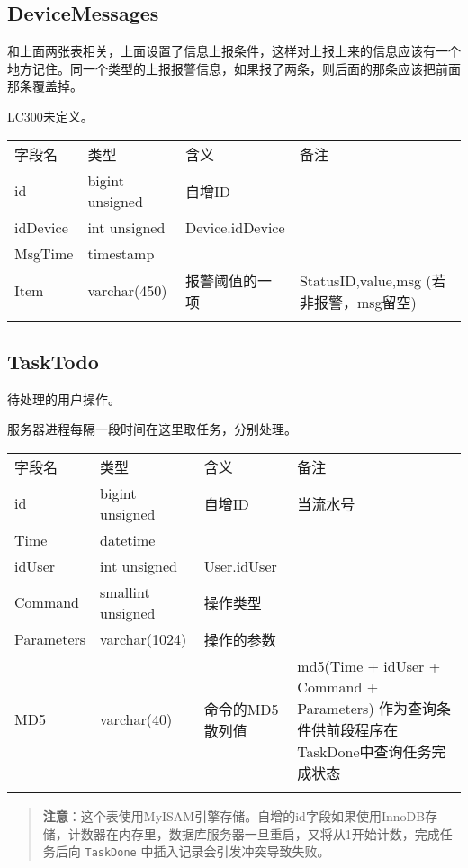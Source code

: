 \subsection{DeviceMessages}\label{devicemessages}

和上面两张表相关，上面设置了信息上报条件，这样对上报上来的信息应该有一个地方记住。同一个类型的上报报警信息，如果报了两条，则后面的那条应该把前面那条覆盖掉。

LC300未定义。

\begin{longtabu}[c]{@{}lXXX@{}}
\toprule\addlinespace
字段名 & 类型 & 含义 & 备注
\\\addlinespace
\midrule\endhead
id & bigint unsigned & 自增ID &
\\\addlinespace
idDevice & int unsigned & Device.idDevice &
\\\addlinespace
MsgTime & timestamp & &
\\\addlinespace
Item & varchar(450) & 报警阈值的一项 & StatusID,value,msg
(若非报警，msg留空)
\\\addlinespace
\bottomrule
\end{longtabu}

\subsection{TaskTodo}\label{tasktodo}

待处理的用户操作。

服务器进程每隔一段时间在这里取任务，分别处理。

\begin{longtabu}[c]{@{}lXXX@{}}
\toprule\addlinespace
字段名 & 类型 & 含义 & 备注
\\\addlinespace
\midrule\endhead
id & bigint unsigned & 自增ID & 当流水号
\\\addlinespace
Time & datetime & &
\\\addlinespace
idUser & int unsigned & User.idUser &
\\\addlinespace
Command & smallint unsigned & 操作类型 &
\\\addlinespace
Parameters & varchar(1024) & 操作的参数 &
\\\addlinespace
MD5 & varchar(40) & 命令的MD5散列值 & md5(Time + idUser + Command +
Parameters) 作为查询条件供前段程序在TaskDone中查询任务完成状态
\\\addlinespace
\bottomrule
\end{longtabu}

\begin{quote}
\textbf{注意}：这个表使用MyISAM引擎存储。自增的id字段如果使用InnoDB存储，计数器在内存里，数据库服务器一旦重启，又将从1开始计数，完成任务后向
\texttt{TaskDone} 中插入记录会引发冲突导致失败。
\end{quote}

